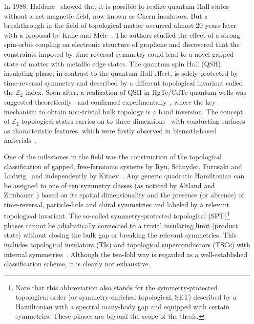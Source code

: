In 1988, Haldane~\cite{Haldane1988} showed that it is possible to realize quantum Hall states without a net magnetic field, now known as Chern insulators. But a breakthrough in the field of topological matter occurred almost 20 years later with a proposal by Kane and Mele~\cite{KaneMeleGraphene, PhysRevLett.95.146802}. The authors studied the effect of a strong spin-orbit coupling on electronic structure of graphene and discovered that the constraints imposed by time-reversal symmetry could lead to a novel gapped state of matter with metallic edge states. The quantum spin Hall (QSH) insulating phase, in contrast to the quantum Hall effect, is solely protected by time-reversal symmetry and described by a different topological invariant called the $\mathbb{Z}_2$ index. Soon after, a realization of QSH in HgTe/CdTe quantum wells was suggested theoretically~\cite{Bernevig1757} and confirmed experimentally~\cite{MolenkampQSHE2007}, where the key mechanism to obtain non-trivial bulk topology is a band inversion. The concept of $\mathbb{Z}_2$ topological states carries on to three dimensions~\cite{PhysRevLett.98.106803, PhysRevB.75.121306, PhysRevB.79.195322} with conducting surfaces as characteristic features, which were firstly observed in bismuth-based materials~\cite{Hsieh2008, Zhang2009, Xia2009}.

One of the milestones in the field was the construction of the topological classification of gapped, free-fermionic systems by Ryu, Schnyder, Furusaki and Ludwig~\cite{10foldSchnyder2008, 10foldRyu2010}  and independently by Kitaev~\cite{10foldKitaev2009}. Any generic quadratic Hamiltonian can be assigned to one of ten symmetry classes (as noticed by Altland and Zirnbauer~\cite{AltlandZirnbauer1997}) based on its spatial dimensionality and the presence (or absence) of time-reversal, particle-hole and chiral symmetries and labeled by a relevant topological invariant. The so-called symmetry-protected topological (SPT)\footnote{Note that this abbreviation also stands for the symmetry-protected topological order (or symmetry-enriched topological, SET) described by a Hamiltonian with a spectral many-body gap and equipped with certain symmetries. These phases are beyond the scope of the thesis.} phases cannot be adiabatically connected to a trivial insulating limit (\ie product state) without closing the bulk gap or breaking the relevant symmetries. This includes topological insulators (TIs) and topological superconductors (TSCs) with internal symmetries~\cite{RevModPhys.83.1057}. Although the ten-fold way is regarded as a well-established classification scheme, it is clearly not exhaustive. 

